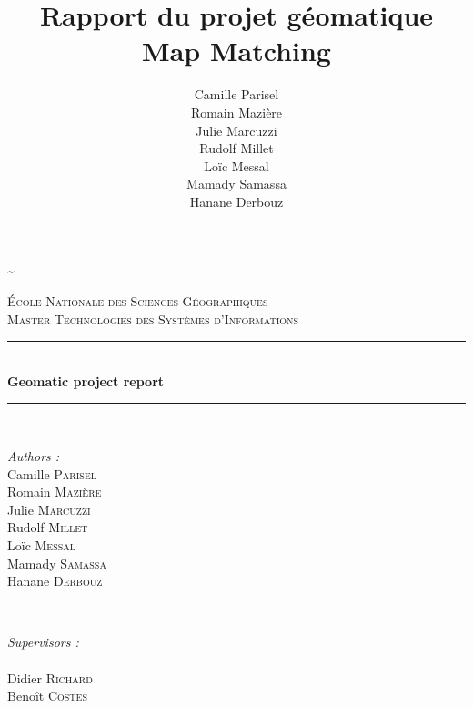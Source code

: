 \documentclass[11pt,a4paper]{report} %
\title{Rapport du projet géomatique \\ Map Matching}
\author{Camille Parisel \\ Romain Mazière \\ Julie Marcuzzi \\ Rudolf Millet \\ Loïc Messal \\ Mamady Samassa \\ Hanane Derbouz}
\begin{document}
\begin{titlepage}
		
	\~ 
	\newline
	\\[2cm]
	\newcommand{\HRule}{\rule{\linewidth}{0.5mm}} %
		
	\center %
		
		
	\textsc{\LARGE \'Ecole Nationale des Sciences Géographiques}\\[0.5cm] %
	\textsc{\Large Master Technologies des Systèmes d'Informations}\\[0.5cm] %
		
	\HRule \\[0.4cm]
	{ \huge \bfseries Geomatic project report}\\[0.4cm] %
	\HRule \\[1.5cm]
	\vfill
		
	\begin{minipage}[t]{0.4\textwidth}
		\begin{flushleft} \large
			\emph{Authors : } \newline \\
			Camille \textsc{Parisel} \\ 
			Romain \textsc{Mazière} \\ 
			Julie \textsc{Marcuzzi} \\ 
			Rudolf \textsc{Millet} \\ 
			Loïc \textsc{Messal} \\ 
			Mamady \textsc{Samassa} \\ 
			Hanane \textsc{Derbouz}
						
		\end{flushleft}
	\end{minipage}
	~
	\begin{minipage}[t]{0.4\textwidth}
		\begin{flushright} \large
			\emph{Supervisors : \\ \ \\ } 
			Didier \textsc{Richard} \\
			Benoît \textsc{Costes} \\
		\end{flushright}
	\end{minipage}\\[1cm]
		

\end{titlepage}
\end{document}
